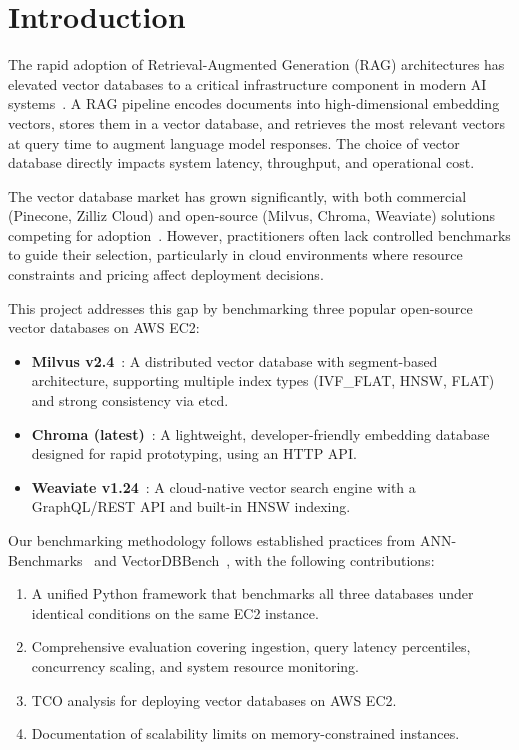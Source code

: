 \documentclass[12pt,a4paper]{article}
\begin{document}
\section{Introduction}

The rapid adoption of Retrieval-Augmented Generation (RAG) architectures has elevated vector databases to a critical infrastructure component in modern AI systems~\cite{lewis2020rag}. A RAG pipeline encodes documents into high-dimensional embedding vectors, stores them in a vector database, and retrieves the most relevant vectors at query time to augment language model responses. The choice of vector database directly impacts system latency, throughput, and operational cost.

The vector database market has grown significantly, with both commercial (Pinecone, Zilliz Cloud) and open-source (Milvus, Chroma, Weaviate) solutions competing for adoption~\cite{pan2024survey}. However, practitioners often lack controlled benchmarks to guide their selection, particularly in cloud environments where resource constraints and pricing affect deployment decisions.

This project addresses this gap by benchmarking three popular open-source vector databases on AWS EC2:
\begin{itemize}[nosep]
    \item \textbf{Milvus v2.4}~\cite{wang2021milvus}: A distributed vector database with segment-based architecture, supporting multiple index types (IVF\_FLAT, HNSW, FLAT) and strong consistency via etcd.
    \item \textbf{Chroma (latest)}~\cite{chroma2024}: A lightweight, developer-friendly embedding database designed for rapid prototyping, using an HTTP API.
    \item \textbf{Weaviate v1.24}~\cite{weaviate2024}: A cloud-native vector search engine with a GraphQL/REST API and built-in HNSW indexing.
\end{itemize}

Our benchmarking methodology follows established practices from ANN-Benchmarks~\cite{annbenchmarks} and VectorDBBench~\cite{vectordbbench}, with the following contributions:
\begin{enumerate}[nosep]
    \item A unified Python framework that benchmarks all three databases under identical conditions on the same EC2 instance.
    \item Comprehensive evaluation covering ingestion, query latency percentiles, concurrency scaling, and system resource monitoring.
    \item TCO analysis for deploying vector databases on AWS EC2.
    \item Documentation of scalability limits on memory-constrained instances.
\end{enumerate}
\end{document}
